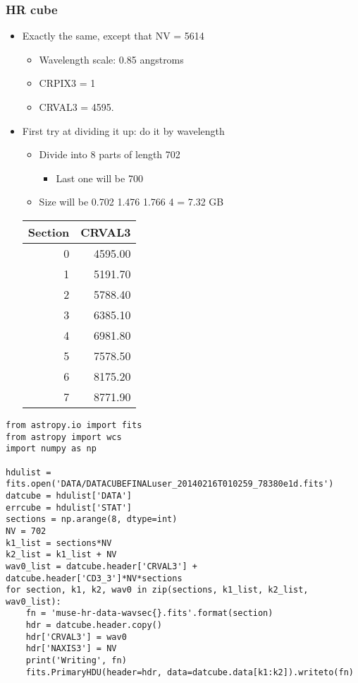 \documentclass[11pt]{article}
\begin{document}
\subsubsection{HR cube}
\label{sec:orgheadline10}
\begin{itemize}
\item Exactly the same, except that NV = 5614
\begin{itemize}
\item Wavelength scale: 0.85 angstroms
\item CRPIX3 = 1
\item CRVAL3 = 4595.
\end{itemize}
\item First try at dividing it up: do it by wavelength
\begin{itemize}
\item Divide into 8 parts of length 702
\begin{itemize}
\item Last one will be 700
\end{itemize}
\item Size will be 0.702 1.476 1.766 4 = 7.32 GB
\end{itemize}
\begin{center}
\begin{tabular}{rr}
Section & CRVAL3\\
\hline
0 & 4595.00\\
1 & 5191.70\\
2 & 5788.40\\
3 & 6385.10\\
4 & 6981.80\\
5 & 7578.50\\
6 & 8175.20\\
7 & 8771.90\\
\end{tabular}
\end{center}
\end{itemize}

\begin{verbatim}
from astropy.io import fits
from astropy import wcs
import numpy as np

hdulist = fits.open('DATA/DATACUBEFINALuser_20140216T010259_78380e1d.fits')
datcube = hdulist['DATA']
errcube = hdulist['STAT']
sections = np.arange(8, dtype=int)
NV = 702
k1_list = sections*NV
k2_list = k1_list + NV
wav0_list = datcube.header['CRVAL3'] + datcube.header['CD3_3']*NV*sections
for section, k1, k2, wav0 in zip(sections, k1_list, k2_list, wav0_list):
    fn = 'muse-hr-data-wavsec{}.fits'.format(section)
    hdr = datcube.header.copy()
    hdr['CRVAL3'] = wav0
    hdr['NAXIS3'] = NV
    print('Writing', fn)
    fits.PrimaryHDU(header=hdr, data=datcube.data[k1:k2]).writeto(fn)
\end{verbatim}
\end{document}
